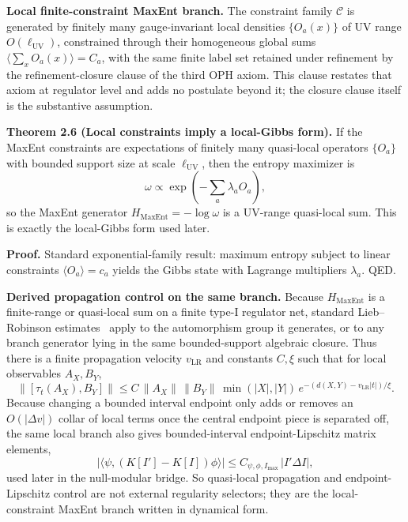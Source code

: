 \textbf{Local finite-constraint MaxEnt branch.} The constraint family \(\mathcal C\) is generated by finitely many gauge-invariant local densities \(\{O_a(x)\}\) of UV range \(O(\ell_{\mathrm{UV}})\), constrained through their homogeneous global sums \(\langle\sum_x O_a(x)\rangle = C_a\), with the same finite label set retained under refinement by the refinement-closure clause of the third OPH axiom. This clause restates that axiom at regulator level and adds no postulate beyond it; the closure clause itself is the substantive assumption.

\textbf{Theorem 2.6 (Local constraints imply a local-Gibbs form).} If the MaxEnt constraints are expectations of finitely many quasi-local operators \(\{O_a\}\) with bounded support size at scale \(\ell_{\mathrm{UV}}\), then the entropy maximizer is
\[
\omega \propto \exp\!\left(-\sum_a \lambda_a O_a\right),
\]
so the MaxEnt generator \(H_{\mathrm{MaxEnt}}=-\log\omega\) is a UV-range quasi-local sum. This is exactly the local-Gibbs form used later.

\textbf{Proof.} Standard exponential-family result: maximum entropy subject to linear constraints \(\langle O_a\rangle=c_a\) yields the Gibbs state with Lagrange multipliers \(\lambda_a\). QED.

\textbf{Derived propagation control on the same branch.} Because \(H_{\mathrm{MaxEnt}}\) is a finite-range or quasi-local sum on a finite type-I regulator net, standard Lieb--Robinson estimates~\cite{liebRobinson72} apply to the automorphism group it generates, or to any branch generator lying in the same bounded-support algebraic closure. Thus there is a finite propagation velocity \(v_{\mathrm{LR}}\) and constants \(C,\xi\) such that for local observables \(A_X,B_Y\),
\[
\bigl\|[\tau_t(A_X),B_Y]\bigr\|
\le
C\,\|A_X\|\,\|B_Y\|\,\min(|X|,|Y|)\,
e^{-(d(X,Y)-v_{\mathrm{LR}}|t|)/\xi}.
\]
Because changing a bounded interval endpoint only adds or removes an \(O(|\Delta v|)\) collar of local terms once the central endpoint piece is separated off, the same local branch also gives bounded-interval endpoint-Lipschitz matrix elements,
\[
\left|\langle\psi,(K[I']-K[I])\phi\rangle\right|
\le
C_{\psi,\phi,I_{\max}}\,|I'\Delta I|,
\]
used later in the null-modular bridge. So quasi-local propagation and endpoint-Lipschitz control are not external regularity selectors; they are the local-constraint MaxEnt branch written in dynamical form.

